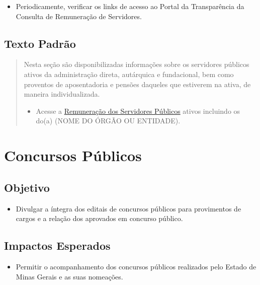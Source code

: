 \documentclass[]{book}
\providecommand{\tightlist}{%
  \setlength{\itemsep}{0pt}\setlength{\parskip}{0pt}}
\begin{document}
\begin{itemize}
\tightlist
\item
  Periodicamente, verificar os links de acesso ao Portal da Transparência da Consulta de Remuneração de Servidores.
\end{itemize}

\hypertarget{texto-padruxe3o-8}{%
\subsection{Texto Padrão}\label{texto-padruxe3o-8}}

\begin{quote}
Nesta seção são disponibilizadas informações sobre os servidores públicos ativos da administração direta, autárquica e fundacional, bem como proventos de aposentadoria e pensões daqueles que estiverem na ativa, de maneira individualizada.

\begin{itemize}
\tightlist
\item
  Acesse a \href{http://www.transparencia.mg.gov.br/estado-pessoal/remuneracao-dos-servidores}{Remuneração dos Servidores Públicos} ativos incluindo os do(a) (NOME DO ÓRGÃO OU ENTIDADE).
\end{itemize}
\end{quote}

\hypertarget{concursos-puxfablicos}{%
\section{Concursos Públicos}\label{concursos-puxfablicos}}

\hypertarget{objetivo-8}{%
\subsection{Objetivo}\label{objetivo-8}}

\begin{itemize}
\tightlist
\item
  Divulgar a íntegra dos editais de concursos públicos para provimentos de cargos e a relação dos aprovados em concurso público.
\end{itemize}

\hypertarget{impactos-esperados-9}{%
\subsection{Impactos Esperados}\label{impactos-esperados-9}}

\begin{itemize}
\tightlist
\item
  Permitir o acompanhamento dos concursos públicos realizados pelo Estado de Minas Gerais e as suas nomeações.
\end{itemize}
\end{document}
